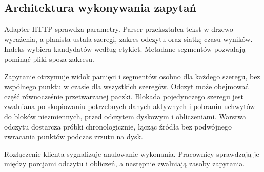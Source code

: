 \documentclass[11pt,a4paper]{article}
\begin{document}
\subsection{Architektura wykonywania zapytań}
Adapter HTTP sprawdza parametry. Parser przekształca
tekst w drzewo wyrażenia, a planista ustala szeregi, zakres odczytu
oraz siatkę czasu wyników. Indeks wybiera kandydatów według etykiet.
Metadane segmentów pozwalają pominąć pliki spoza zakresu.

Zapytanie otrzymuje widok pamięci i segmentów osobno dla każdego szeregu,
bez wspólnego punktu w czasie dla wszystkich szeregów. Odczyt może obejmować
część równocześnie przetwarzanej paczki. Blokada pojedynczego szeregu jest
zwalniana po skopiowaniu potrzebnych danych aktywnych i pobraniu uchwytów
do bloków niezmiennych, przed odczytem dyskowym i obliczeniami.
Warstwa odczytu dostarcza próbki chronologicznie, łącząc źródła bez
podwójnego zwracania punktów podczas zrzutu na dysk.


Rozłączenie klienta sygnalizuje anulowanie wykonania. Pracownicy
sprawdzają je między porcjami odczytu i obliczeń, a następnie zwalniają
zasoby zapytania.
\end{document}
